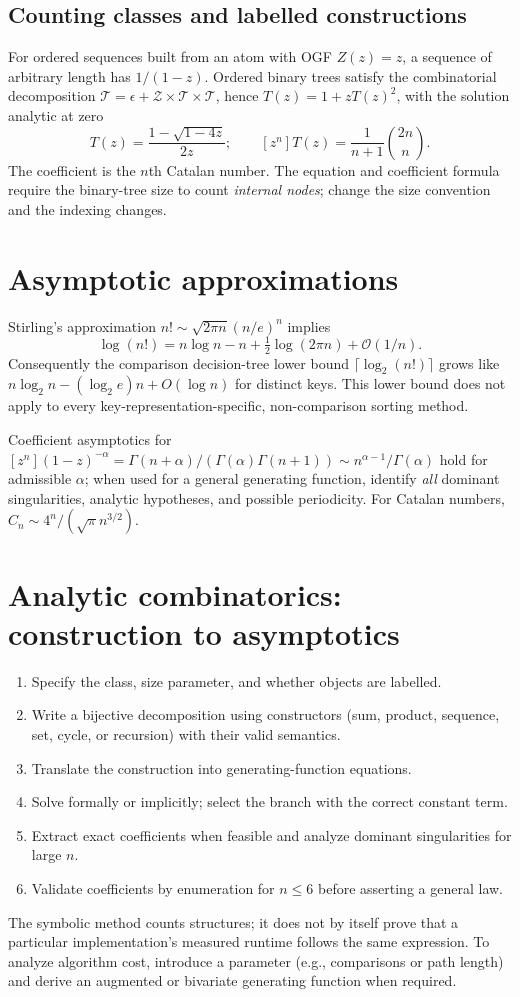 \documentclass[11pt]{article}
\providecommand{\bigoh}{\mathcal{O}}
\begin{document}
\subsection{Counting classes and labelled constructions}
For ordered sequences built from an atom with OGF $Z(z)=z$, a sequence of arbitrary length has $1/(1-z)$. Ordered binary trees satisfy the combinatorial decomposition $\mathcal{T}=\epsilon+\mathcal{Z}\times\mathcal{T}\times\mathcal{T}$, hence $T(z)=1+zT(z)^2$, with the solution analytic at zero
\[
T(z)=\frac{1-\sqrt{1-4z}}{2z};\qquad [z^n]T(z)=\frac{1}{n+1}\binom{2n}{n}.
\]
The coefficient is the $n$th Catalan number. The equation and coefficient formula require the binary-tree size to count \emph{internal nodes}; change the size convention and the indexing changes.

\section{Asymptotic approximations}
Stirling's approximation $n!\sim\sqrt{2\pi n}(n/e)^n$ implies
\[
\log(n!)=n\log n-n+\tfrac12\log(2\pi n)+\bigoh(1/n).
\]
Consequently the comparison decision-tree lower bound $\lceil \log_2(n!)\rceil$ grows like $n\log_2n-(\log_2e)n+O(\log n)$ for distinct keys. This lower bound does not apply to every key-representation-specific, non-comparison sorting method.

Coefficient asymptotics for $[z^n](1-z)^{-\alpha}=\Gamma(n+\alpha)/(\Gamma(\alpha)\Gamma(n+1))\sim n^{\alpha-1}/\Gamma(\alpha)$ hold for admissible $\alpha$; when used for a general generating function, identify \emph{all} dominant singularities, analytic hypotheses, and possible periodicity. For Catalan numbers, $C_n\sim4^n/(\sqrt{\pi}n^{3/2})$.

\section{Analytic combinatorics: construction to asymptotics}
\begin{enumerate}
\item Specify the class, size parameter, and whether objects are labelled.
\item Write a bijective decomposition using constructors (sum, product, sequence, set, cycle, or recursion) with their valid semantics.
\item Translate the construction into generating-function equations.
\item Solve formally or implicitly; select the branch with the correct constant term.
\item Extract exact coefficients when feasible and analyze dominant singularities for large $n$.
\item Validate coefficients by enumeration for $n\leq 6$ before asserting a general law.
\end{enumerate}
The symbolic method counts structures; it does not by itself prove that a particular implementation's measured runtime follows the same expression. To analyze algorithm cost, introduce a parameter (e.g., comparisons or path length) and derive an augmented or bivariate generating function when required.
\end{document}
